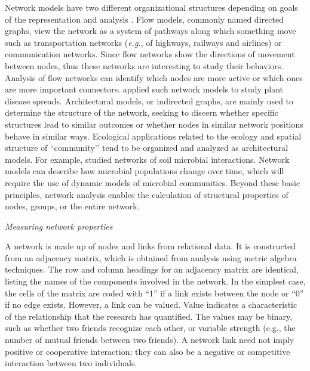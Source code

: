 Network models have two different organizational structures depending on goals of the representation and analysis . Flow models, commonly named directed graphs, view the network as a system of pathways along which something move such as transportation networks (\textit{e.g.}, of highways, railways and airlines) or communication networks. Since flow networks show the directions of movement between nodes, thus these networks are interesting to study their behaviors. Analysis of flow networks can identify which nodes are more active or which ones are more important connectors.  applied such network models to study plant disease spreads. Architectural models, or indirected graphs, are mainly used to determine the structure of the network, seeking to discern whether specific structures lead to similar outcomes or whether nodes in similar network positions behave in similar ways. Ecological applications related to the ecology and spatial structure of ``community’’ tend to be organized and analyzed as architectural models. For example,  studied networks of soil microbial interactions. Network models can describe how microbial populations change over time, which will require the use of dynamic models of microbial communities. Beyond these basic principles, network analysis enables the calculation of structural properties of nodes, groups, or the entire network.

\textit{Measuring network properties}

A network is made up of nodes and links from relational data. It is constructed from an adjacency matrix, which is obtained from analysis using metric algebra techniques. The row and column headings for an adjacency matrix are identical, listing the names of the components involved in the network. In the simplest case, the cells of the matrix are coded with ``1'' if a link exists between the node or ``0'' if no edge exists. However, a link can be valued. Value indicates a characteristic of the relationship that the research has quantified. The values may be binary, such as whether two friends recognize each other, or variable strength (e.g., the number of mutual friends between two friends). A network link need not imply positive or cooperative interaction; they can also be a negative or competitive interaction between two individuals.    

